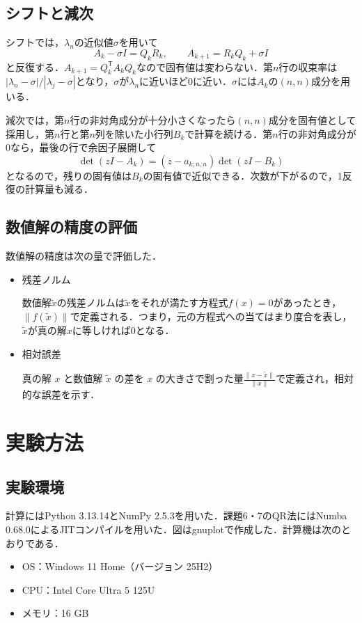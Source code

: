 \documentclass{jarticle}
\begin{document}
\subsection{シフトと減次}
シフトでは，$\lambda_n$の近似値$\sigma$を用いて
\[
    A_k-\sigma I=Q_kR_k,\qquad A_{k+1}=R_kQ_k+\sigma I
\]
と反復する．$A_{k+1}=Q_k^{\mathsf T}A_kQ_k$なので固有値は変わらない．第$n$行の収束率は$|\lambda_n-\sigma|/|\lambda_j-\sigma|$となり，$\sigma$が$\lambda_n$に近いほど0に近い．$\sigma$には$A_k$の$(n,n)$成分を用いる．

減次では，第$n$行の非対角成分が十分小さくなったら$(n,n)$成分を固有値として採用し，第$n$行と第$n$列を除いた小行列$B_k$で計算を続ける．第$n$行の非対角成分が0なら，最後の行で余因子展開して
\[
    \det(zI-A_k)=(z-a_{k;n,n})\det(zI-B_k)
\]
となるので，残りの固有値は$B_k$の固有値で近似できる．次数が下がるので，1反復の計算量も減る．

\subsection{数値解の精度の評価}
数値解の精度は次の量で評価した．
  \begin{itemize}
      \item 残差ノルム

数値解$\tilde{x}$の残差ノルムは$\tilde{x}$をそれが満たす方程式$f(x)=0$があったとき，$\|f(\tilde{x})\|$で定義される．つまり，元の方程式への当てはまり度合を表し，$\tilde{x}$が真の解$x$に等しければ$0$となる．

      \item 相対誤差

      
      真の解 $x$ と数値解 $\tilde{x}$ の差を $x$ の大きさで割った量$\frac{\| x - \tilde{x} \|}{\| x \|}$で定義され，相対的な誤差を示す．
  \end{itemize}

\section{実験方法}

\subsection{実験環境}
計算にはPython 3.13.14とNumPy 2.5.3を用いた．課題6・7のQR法にはNumba 0.68.0によるJITコンパイルを用いた．図はgnuplotで作成した．計算機は次のとおりである．
\begin{itemize}
    \item OS：Windows 11 Home（バージョン 25H2）
    \item CPU：Intel Core Ultra 5 125U
    \item メモリ：16 GB
\end{itemize}
\end{document}
